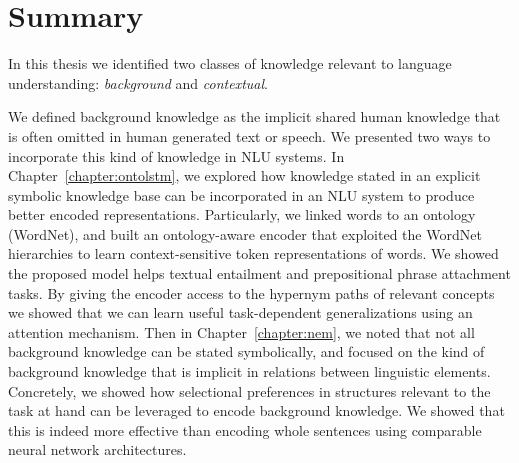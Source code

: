 

\section{Summary}
In this thesis we identified two classes of knowledge relevant to language
understanding: \textit{background} and \textit{contextual}.

We defined background knowledge as the implicit shared human knowledge that is
often omitted in human generated text or speech. We presented two ways to
incorporate this kind of knowledge in NLU systems.  In Chapter~\ref{chapter:ontolstm},
we explored how knowledge stated in an explicit symbolic knowledge base can be
incorporated in an NLU system to produce better encoded representations.
Particularly, we linked words to an ontology (WordNet),
and built an ontology-aware encoder that exploited the WordNet
hierarchies to learn context-sensitive token representations of words. We showed
the proposed model helps textual entailment and prepositional phrase attachment
tasks. By giving the encoder access to the hypernym paths of relevant concepts
we showed that we can learn useful task-dependent generalizations using an
attention mechanism.
Then in Chapter~\ref{chapter:nem}, we noted that not all background knowledge
can be stated symbolically, and focused on the kind of background knowledge that
is implicit in relations between linguistic elements. Concretely, we showed how selectional
preferences in structures relevant to the task at hand can be leveraged to
encode background knowledge. We showed that this is indeed more effective than
encoding whole sentences using comparable neural network architectures. 

